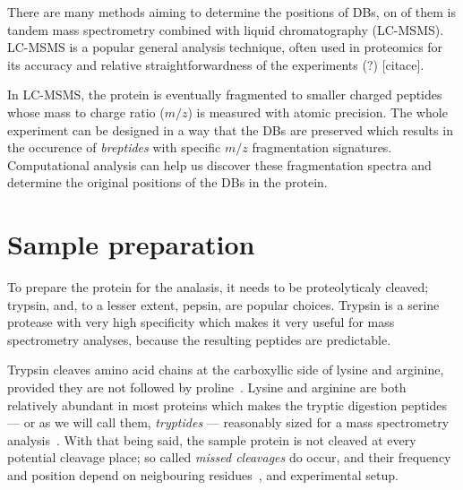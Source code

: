 There are many methods aiming to determine the positions of DBs, on of them is tandem mass spectrometry combined with liquid chromatography (LC-MSMS). LC-MSMS is a popular general analysis technique, often used in proteomics for its accuracy and relative straightforwardness of the experiments (?) [citace].

In LC-MSMS, the protein is eventually fragmented to smaller charged peptides whose mass to charge ratio (\(m/z\)) is measured with atomic precision. The whole experiment can be designed in a way that the DBs are preserved which results in the occurence of \emph{breptides} with specific \(m/z\) fragmentation signatures. Computational analysis can help us discover these fragmentation spectra and determine the original positions of the DBs in the protein.





\section{Sample preparation}


To prepare the protein for the analasis, it needs to be proteolyticaly cleaved; trypsin, and, to a lesser extent, pepsin, are popular choices. Trypsin is a serine protease with very high specificity which makes it very useful for mass spectrometry analyses, because the resulting peptides are predictable.

Trypsin cleaves amino acid chains at the carboxyllic side of lysine and arginine, provided they are not followed by proline~\cite{olsen2004trypsin}. Lysine and arginine are both relatively abundant in most proteins which makes the tryptic digestion peptides --- or as we will call them, \emph{tryptides} --- reasonably sized for a mass spectrometry analysis~\cite{matthiesen2020trypticsize}. With that being said, the sample protein is not cleaved at every potential cleavage place; so called \emph{missed cleavages} do occur, and their frequency and position depend on neigbouring residues~\cite{gershon2014cleaved}, and experimental setup.

